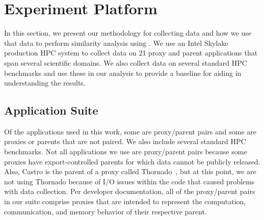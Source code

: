 \section{Experiment Platform}
\label{sec:expPlatform}
In this section, we present our methodology for collecting data and 
how we use that data to perform similarity analysis using \us.  We use
an Intel Skylake production HPC system to collect
data on 21 proxy and parent applications that span several scientific
domains.  We also collect data on several standard HPC benchmarks and 
use these in our analysis to provide a baseline for aiding in understanding the results.
 
\subsection{Application Suite}
Of the applications used in this work, some are proxy/parent pairs and
some are proxies or parents that are not paired. We also include several
standard HPC benchmarks.
Not all applications
we use are proxy/parent pairs because some proxies 
have export-controlled parents for which data cannot be 
publicly released.  Also, Castro is the parent of a 
proxy called Thornado~\cite{ECPProxySuite1}, but at this point, we are not
using Thornado because of I/O issues within the code that caused problems with 
data collection. Per developer documentation, all of the proxy/parent pairs in our suite
comprise proxies that are intended to represent the computation, communication, and memory 
behavior of their respective parent.

